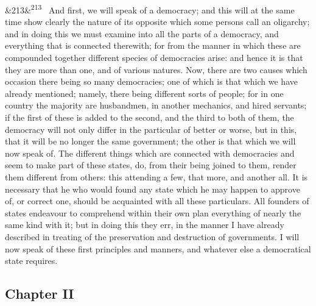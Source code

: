 \documentclass[12pt]{article}
\newcommand{\para}[1][]{\par\noindent\ifx&#1&\else\textsuperscript{\footnotesize #1}~\fi}
\begin{document}
\para[213] And first, we will speak of a democracy; and this will at the same time show clearly the nature of its opposite which some persons call an oligarchy; and in doing this we must examine into all the parts of a democracy, and everything that is connected therewith; for from the manner in which these are compounded together different species of democracies arise: and hence it is that they are more than one, and of various natures. Now, there are two causes which occasion there being so many democracies; one of which is that which we have already mentioned; namely, there being different sorts of people; for in one country the majority are husbandmen, in another mechanics, and hired servants; if the first of these is added to the second, and the third to both of them, the democracy will not only differ in the particular of better or worse, but in this, that it will be no longer the same government; the other is that which we will now speak of. The different things which are connected with democracies and seem to make part of these states, do, from their being joined to them, render them different from others: this attending a few, that more, and another all. It is necessary that he who would found any state which he may happen to approve of, or correct one, should be acquainted with all these particulars. All founders of states endeavour to comprehend within their own plan everything of nearly the same kind with it; but in doing this they err, in the manner I have already described in treating of the preservation and destruction of governments. I will now speak of these first principles and manners, and whatever else a democratical state requires.

\subsection*{Chapter II}
\end{document}

